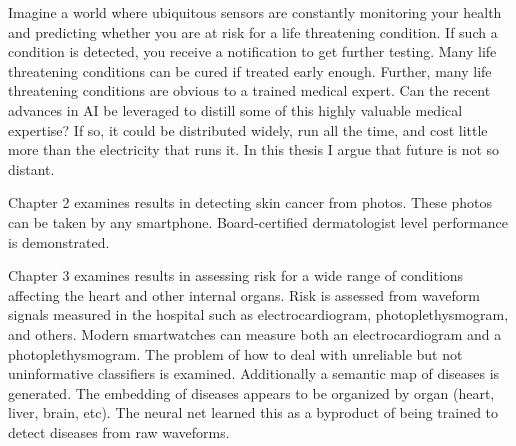 Imagine a world where ubiquitous sensors are constantly monitoring your health and predicting whether you are at risk for a life threatening condition.  If such a condition is detected, you receive a notification to get further testing.  Many life threatening conditions can be cured if treated early enough.  Further, many life threatening conditions are obvious to a trained medical expert.  Can the recent advances in AI be leveraged to distill some of this highly valuable medical expertise?  If so, it could be distributed widely, run all the time, and cost little more than the electricity that runs it.  In this thesis I argue that future is not so distant.  

Chapter 2 examines results in detecting skin cancer from photos.  These photos can be taken by any smartphone.  Board-certified dermatologist level performance is demonstrated.

Chapter 3 examines results in assessing risk for a wide range of conditions affecting the heart and other internal organs.  Risk is assessed from waveform signals measured in the hospital such as electrocardiogram, photoplethysmogram, and others.  Modern smartwatches can measure both an electrocardiogram and a photoplethysmogram.  The problem of how to deal with unreliable but not uninformative classifiers is examined.  Additionally a semantic map of diseases is generated.  The embedding of diseases appears to be organized by organ (heart, liver, brain, etc).  The neural net learned this as a byproduct of being trained to detect diseases from raw waveforms.